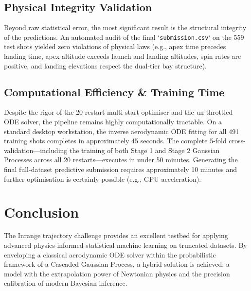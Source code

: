\documentclass[11pt, a4paper]{article}
\begin{document}
\subsection{Physical Integrity Validation}
Beyond raw statistical error, the most significant result is the structural integrity of the predictions. 
An automated audit of the final `\texttt{submission.csv}` on the 559 test shots yielded zero violations of physical laws (e.g., apex time precedes landing time, apex altitude exceeds launch and landing altitudes, spin rates are positive, and landing elevations respect the dual-tier bay structure).

\subsection{Computational Efficiency \& Training Time}
Despite the rigor of the 20-restart multi-start optimiser and the un-throttled ODE solver, the pipeline remains highly computationally tractable. 
On a standard desktop workstation, the inverse aerodynamic ODE fitting for all 491 training shots completes in approximately 45 seconds. 
The complete 5-fold cross-validation—including the training of both Stage 1 and Stage 2 Gaussian Processes across all 20 restarts—executes in under 50 minutes. 
Generating the final full-dataset predictive submission requires approximately 10 minutes and further optimisation is certainly possible (e.g., GPU acceleration).

\section{Conclusion}
The Inrange trajectory challenge provides an excellent testbed for applying advanced physics-informed statistical machine learning on truncated datasets. 
By enveloping a classical aerodynamic ODE solver within the probabilistic framework of a Cascaded Gaussian Process, a hybrid solution is achieved: 
a model with the extrapolation power of Newtonian physics and the precision calibration of modern Bayesian inference. 
\end{document}
